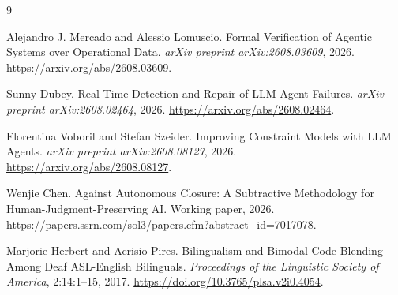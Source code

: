 \documentclass[11pt]{article}
\begin{document}
\begin{thebibliography}{9}

Alejandro J. Mercado and Alessio Lomuscio.
\newblock Formal Verification of Agentic Systems over Operational Data.
\newblock \emph{arXiv preprint arXiv:2608.03609}, 2026.
\newblock \url{https://arxiv.org/abs/2608.03609}.

Sunny Dubey.
\newblock Real-Time Detection and Repair of LLM Agent Failures.
\newblock \emph{arXiv preprint arXiv:2608.02464}, 2026.
\newblock \url{https://arxiv.org/abs/2608.02464}.

Florentina Voboril and Stefan Szeider.
\newblock Improving Constraint Models with LLM Agents.
\newblock \emph{arXiv preprint arXiv:2608.08127}, 2026.
\newblock \url{https://arxiv.org/abs/2608.08127}.

Wenjie Chen.
\newblock Against Autonomous Closure: A Subtractive Methodology for Human-Judgment-Preserving AI.
\newblock Working paper, 2026.
\newblock \url{https://papers.ssrn.com/sol3/papers.cfm?abstract_id=7017078}.

Marjorie Herbert and Acrisio Pires.
\newblock Bilingualism and Bimodal Code-Blending Among Deaf ASL-English Bilinguals.
\newblock \emph{Proceedings of the Linguistic Society of America}, 2:14:1--15, 2017.
\newblock \url{https://doi.org/10.3765/plsa.v2i0.4054}.

\end{thebibliography}
\end{document}
